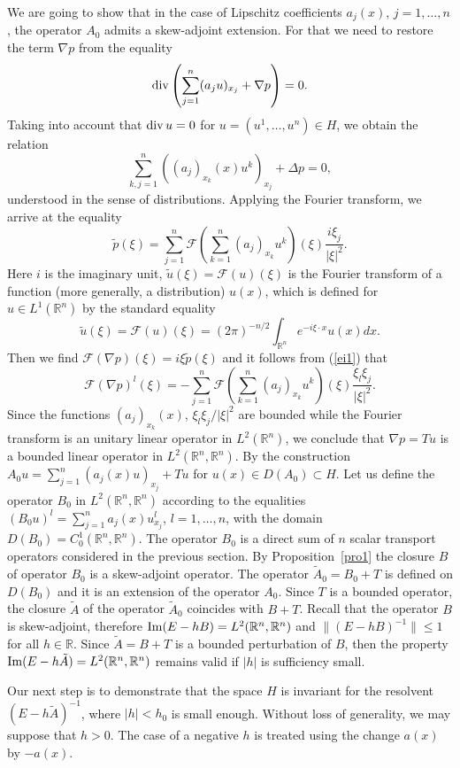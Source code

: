 \documentclass[12pt]{article}
\newcommand{\R}{{\mathbb R}}
\newcommand{\F}{{\mathcal F}}
\renewcommand{\div}{\mathop{\rm div}\nolimits}
\renewcommand{\Im}{\mathop{\rm Im}}
\numberwithin{equation}{section}
\theoremstyle{plain}
\theoremstyle{definition}
\begin{document}
We are going to show that in the case of Lipschitz coefficients $a_j(x)$, $j=1,\ldots,n$, the operator $A_0$ admits a skew-adjoint extension. For that we need to restore the term $\nabla p$ from the equality
\[
\div\left(\sum_{j=1}^n (a_j u)_{x_j}+\nabla p\right)=0.
\]
Taking into account that $\div u=0$ for $u=(u^1,\ldots,u^n)\in H$, we obtain the relation
\[
\sum_{k,j=1}^n ((a_j)_{x_k}(x)u^k)_{x_j}+\Delta p=0,
\]
understood in the sense of distributions. Applying the Fourier transform, we arrive at the equality
\begin{equation}\label{ei1}
\tilde p(\xi)=\sum_{j=1}^n \F\left(\sum_{k=1}^n(a_j)_{x_k}u^k\right)(\xi)\frac{i\xi_j}{|\xi|^2}.
\end{equation}
Here $i$ is the imaginary unit, $\tilde u(\xi)=\F(u)(\xi)$ is the Fourier transform of a function (more generally, a distribution) $u(x)$, which is defined for $u\in L^1(\R^n)$ by the standard equality
\[
\tilde u(\xi)=\F(u)(\xi)=(2\pi)^{-n/2}\int_{\R^n}e^{-i\xi\cdot x}u(x)dx.
\]
Then we find $\F(\nabla p)(\xi)=i\xi\tilde p(\xi)$ and it follows from (\ref{ei1}) that
\begin{equation}\label{ei2}
\F(\nabla p)^l(\xi)=-\sum_{j=1}^n\F\left(\sum_{k=1}^n(a_j)_{x_k}u^k\right)(\xi)\frac{\xi_l\xi_j}{|\xi|^2}.
\end{equation}
Since the functions $(a_j)_{x_k}(x)$, $\xi_l\xi_j/|\xi|^2$ are bounded while the Fourier transform is an unitary linear operator in $L^2(\R^n)$, we conclude that $\nabla p=Tu$ is a bounded linear operator in $L^2(\R^n,\R^n)$. By the construction $A_0u=\sum_{j=1}^n (a_j(x)u)_{x_j}+Tu$ for $u(x)\in D(A_0)\subset H$. Let us define the operator $B_0$ in
$L^2(\R^n,\R^n)$ according to the equalities $(B_0u)^l=\sum_{j=1}^n a_j(x)u^l_{x_j}$, $l=1,\ldots,n$, with the domain $D(B_0)=C_0^1(\R^n,\R^n)$. The operator $B_0$ is a direct sum of $n$ scalar transport operators considered in the previous section. By Proposition~\ref{pro1} the closure $B$ of operator $B_0$ is a skew-adjoint operator. The operator $\tilde A_0=B_0+T$ is defined on $D(B_0)$ and it is an extension of the operator $A_0$. Since $T$ is a bounded operator, the closure $\tilde A$ of the operator $\tilde A_0$ coincides with $B+T$.
Recall that the operator $B$ is skew-adjoint, therefore $\Im(E-hB)=L^2(\R^n,\R^n)$ and $\|(E-hB)^{-1}\|\le 1$ for all $h\in\R$. Since $\tilde A=B+T$ is a bounded perturbation of $B$, then the property $\Im(E-h\tilde A)=L^2(\R^n,\R^n)$ remains valid if $|h|$ is sufficiency small.

Our next step is to demonstrate that the space $H$ is invariant for the resolvent $(E-h\tilde A)^{-1}$, where $|h|<h_0$ is small enough.
Without loss of generality, we may suppose that $h>0$. The case of a negative $h$ is treated using the change
$a(x)$ by $-a(x)$.
\end{document}
